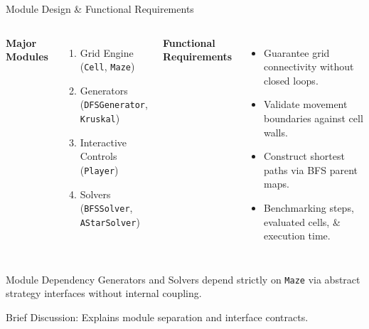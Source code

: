 \documentclass[aspectratio=169,11pt]{beamer}
\newcommand{\smallnote}[1]{%
\vspace{0.08cm}
{\scriptsize\color{GEUGrey}#1}
}
\begin{document}
\begin{frame}{Module Design \& Functional Requirements}

\begin{columns}[T,totalwidth=\textwidth]


\textbf{\color{GEUBlue}Major Modules}

\begin{enumerate}\itemsep3pt
\item Grid Engine (\texttt{Cell}, \texttt{Maze})
\item Generators (\texttt{DFSGenerator}, \texttt{Kruskal})
\item Interactive Controls (\texttt{Player})
\item Solvers (\texttt{BFSSolver}, \texttt{AStarSolver})
\end{enumerate}


\textbf{\color{GEUBlue}Functional Requirements}

\begin{itemize}\itemsep3pt
\item Guarantee grid connectivity without closed loops.
\item Validate movement boundaries against cell walls.
\item Construct shortest paths via BFS parent maps.
\item Benchmarking steps, evaluated cells, \& execution time.
\end{itemize}

\end{columns}

\vspace{2mm}

\begin{block}{Module Dependency}
\small Generators and Solvers depend strictly on \texttt{Maze} via abstract strategy interfaces without internal coupling.
\end{block}

\vfill

\smallnote{
Brief Discussion: Explains module separation and interface contracts.
}

\end{frame}
\end{document}
